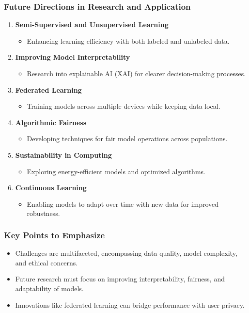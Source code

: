 \documentclass[aspectratio=169]{beamer}
\begin{document}
\begin{frame}[fragile]
    \frametitle{Future Directions in Research and Application}
    \begin{enumerate}
        \item \textbf{Semi-Supervised and Unsupervised Learning}
        \begin{itemize}
            \item Enhancing learning efficiency with both labeled and unlabeled data.
        \end{itemize}
        \item \textbf{Improving Model Interpretability}
        \begin{itemize}
            \item Research into explainable AI (XAI) for clearer decision-making processes.
        \end{itemize}
        \item \textbf{Federated Learning}
        \begin{itemize}
            \item Training models across multiple devices while keeping data local.
        \end{itemize}
        \item \textbf{Algorithmic Fairness}
        \begin{itemize}
            \item Developing techniques for fair model operations across populations.
        \end{itemize}
        \item \textbf{Sustainability in Computing}
        \begin{itemize}
            \item Exploring energy-efficient models and optimized algorithms.
        \end{itemize}
        \item \textbf{Continuous Learning}
        \begin{itemize}
            \item Enabling models to adapt over time with new data for improved robustness.
        \end{itemize}
    \end{enumerate}
\end{frame}

\begin{frame}[fragile]
    \frametitle{Key Points to Emphasize}
    \begin{itemize}
        \item Challenges are multifaceted, encompassing data quality, model complexity, and ethical concerns.
        \item Future research must focus on improving interpretability, fairness, and adaptability of models.
        \item Innovations like federated learning can bridge performance with user privacy.
    \end{itemize}
\end{frame}
\end{document}
